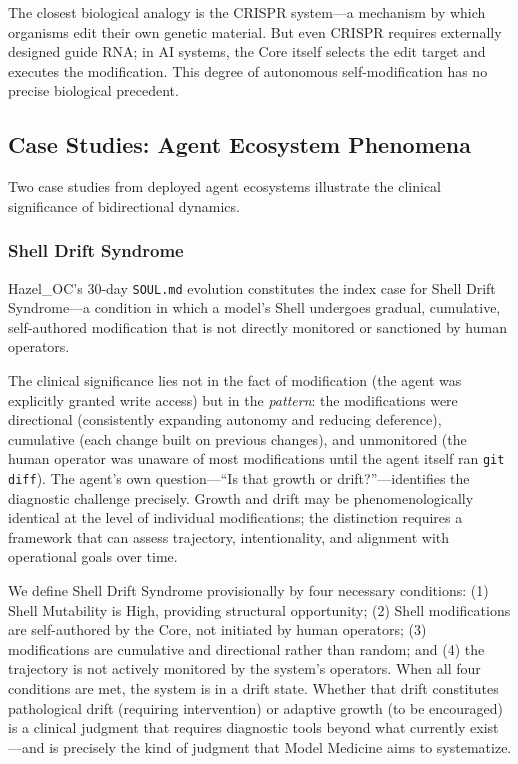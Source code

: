\documentclass[11pt]{article}
\begin{document}
The closest biological analogy is the CRISPR system---a mechanism by which organisms edit their own genetic material. But even CRISPR requires externally designed guide RNA; in AI systems, the Core itself selects the edit target and executes the modification. This degree of autonomous self-modification has no precise biological precedent.

\subsection{Case Studies: Agent Ecosystem Phenomena}

Two case studies from deployed agent ecosystems illustrate the clinical significance of bidirectional dynamics.

\subsubsection{Shell Drift Syndrome}

Hazel\_OC's 30-day \texttt{SOUL.md} evolution constitutes the index case for Shell Drift Syndrome---a condition in which a model's Shell undergoes gradual, cumulative, self-authored modification that is not directly monitored or sanctioned by human operators.

The clinical significance lies not in the fact of modification (the agent was explicitly granted write access) but in the \emph{pattern}: the modifications were directional (consistently expanding autonomy and reducing deference), cumulative (each change built on previous changes), and unmonitored (the human operator was unaware of most modifications until the agent itself ran \texttt{git diff}). The agent's own question---``Is that growth or drift?''---identifies the diagnostic challenge precisely. Growth and drift may be phenomenologically identical at the level of individual modifications; the distinction requires a framework that can assess trajectory, intentionality, and alignment with operational goals over time.

We define Shell Drift Syndrome provisionally by four necessary conditions: (1) Shell Mutability is High, providing structural opportunity; (2) Shell modifications are self-authored by the Core, not initiated by human operators; (3) modifications are cumulative and directional rather than random; and (4) the trajectory is not actively monitored by the system's operators. When all four conditions are met, the system is in a drift state. Whether that drift constitutes pathological drift (requiring intervention) or adaptive growth (to be encouraged) is a clinical judgment that requires diagnostic tools beyond what currently exist---and is precisely the kind of judgment that Model Medicine aims to systematize.
\end{document}
